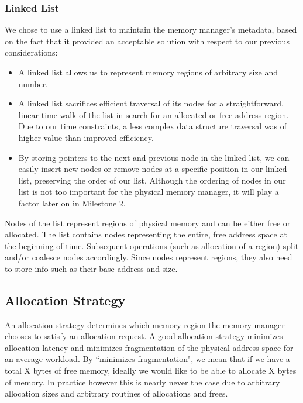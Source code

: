\subsubsection{Linked List}\label{m1-2}
We chose to use a linked list to maintain the memory manager's metadata, based on the fact that it provided an acceptable solution with respect to our previous considerations:
\begin{itemize}
    \item A linked list allows us to represent memory regions of arbitrary size and number.
    \item A linked list sacrifices efficient traversal of its nodes for a straightforward, linear-time walk of the list in search for an allocated or free address region. Due to our time constraints, a less complex data structure traversal was of higher value than improved efficiency.
    \item By storing pointers to the next and previous node in the linked list, we can easily insert new nodes or remove nodes at a specific position in our linked list, preserving the order of our list. Although the ordering of nodes in our list is not too important for the physical memory manager, it will play a factor later on in Milestone 2.
\end{itemize}
Nodes of the list represent regions of physical memory and can be either free or allocated. The list contains nodes representing the entire, free address space at the beginning of time. Subsequent operations (such as allocation of a region) split and/or coalesce nodes accordingly. Since nodes represent regions, they also need to store info such as their base address and size. 

\subsection{Allocation Strategy}
An allocation strategy determines which memory region the memory manager chooses to satisfy an allocation request. A good allocation strategy minimizes allocation latency and minimizes fragmentation of the physical address space for an average workload. By ``minimizes fragmentation", we mean that if we have a total X bytes of free memory, ideally we would like to be able to allocate X bytes of memory. In practice however this is nearly never the case due to arbitrary allocation sizes and arbitrary routines of allocations and frees.

